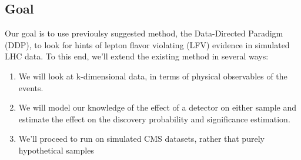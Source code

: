 \documentclass[../ddppaper3.tex]{subfiles}
\begin{document}
\subsection{Goal}

Our goal is to use previoulsy suggested method, the Data-Directed Paradigm (DDP), to look for hints of lepton flavor violating (LFV) evidence in simulated LHC data. To this end, we'll extend the existing method in several ways:
\begin{enumerate}
    \item We will look at k-dimensional data, in terms of physical observables of the events.
    \item We will model our knowledge of the effect of a detector on either sample and estimate the effect on the discovery probability and significance estimation.
    \item We'll proceed to run on simulated CMS datasets, rather that purely hypothetical samples
\end{enumerate}
\end{document}
